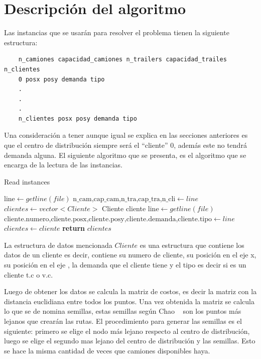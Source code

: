 \documentclass[letter, 10pt]{article}
\begin{document}
\section{Descripci\'on del algoritmo}
Las instancias que se usarán para resolver el problema tienen la siguiente estructura:
\begin{verbatim}
    n_camiones capacidad_camiones n_trailers capacidad_trailes n_clientes
    0 posx posy demanda tipo
    .
    .
    .
    n_clientes posx posy demanda tipo
\end{verbatim}
Una consideración a tener aunque igual se explica en las secciones anteriores es que el centro de distribución siempre será el ``cliente'' 0, además este no tendrá demanda alguna. El siguiente algoritmo que se presenta, es el algoritmo que se encarga de la lectura de las instancias.
\begin{algorithm}
\caption{Read instances}\label{lectura_instances}
\begin{algorithmic}[1]
    \State $\text{line}\gets  getline(file)$ 
    \State $\text{n\_cam,cap\_cam,n\_tra,cap\_tra,n\_cli}\gets line$
    \State $ clientes \gets vector<Cliente>$ 
    \State Cliente cliente
    \State $\text{line}\gets  getline(file)$ 
    \State $\text{cliente.numero,cliente.posx,cliente.posy,cliente.demanda,cliente.tipo}\gets line$
    \State $clientes\gets cliente$
\EndWhile\label{Lectura}
\State \textbf{return} $clientes$
\EndProcedure
\end{algorithmic}
\end{algorithm}

La estructura de datos mencionada $Cliente$ es una estructura que contiene los datos de un cliente es decir, contiene su numero de cliente, su posición en el eje x, su posición en el eje , la demanda que el cliente tiene y el tipo es decir si es un cliente t.c o v.c.

Luego de obtener los datos se calcula la matriz de costos, es decir la matriz con la distancia euclidiana entre todos los puntos. Una vez obtenida la matriz se calcula lo que se de nomina semillas, estas semillas según Chao ~\cite{Chao} son los puntos más lejanos que crearán las rutas. El procedimiento para generar las semillas es el siguiente: primero se elige el nodo más lejano respecto al centro de distribución, luego se elige el segundo mas lejano del centro de distribución y las semillas. Esto se hace la misma cantidad de veces que camiones disponibles haya.
\end{document}
